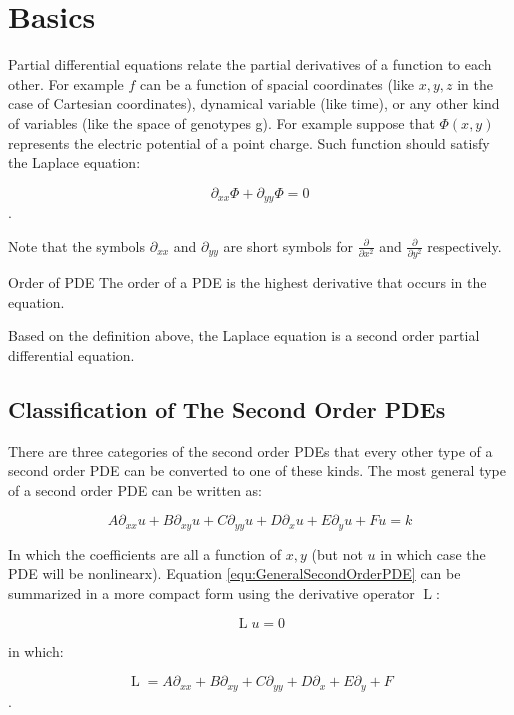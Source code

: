 \section{Basics}
Partial differential equations relate the partial derivatives of a function to each other. For example $f$ can be a function of spacial coordinates (like $x,y,z$ in the case of Cartesian coordinates), dynamical variable (like time), or any other kind of variables (like the space of genotypes g). For example suppose that $ \Phi(x,y) $ represents the electric potential of a point charge. Such function should satisfy the Laplace equation:

\[	 \partial_{xx} \Phi + \partial_{yy} \Phi = 0	\]. 

Note that the symbols $ \partial_{xx} $ and $ \partial_{yy} $ are short symbols for $ \frac{\partial}{\partial x^2} $ and $ \frac{\partial}{\partial y^2} $ respectively.

\begin{defbox}{Order of PDE}
	The order of a PDE is the highest derivative that occurs in the equation. 
\end{defbox}

Based on the definition above, the Laplace equation is a second order partial differential equation. 

\subsection{Classification of The Second Order PDEs }

There are three categories of the second order PDEs that every other type of a second order PDE can be converted to one of these kinds. The most general type of a second order PDE can be written as:

\begin{equation}
	A \partial_{xx} u + B \partial_{xy} u + C \partial_{yy} u + D \partial_{x} u + E \partial_{y} u + F u = k
	\label{equ:GeneralSecondOrderPDE}
\end{equation}

In which the coefficients are all a function of $x,y$ (but not $ u $ in which case the PDE will be nonlinearx). Equation \ref{equ:GeneralSecondOrderPDE} can be summarized in a more compact form using the derivative operator $ \operatorname{L} $: 

\[	 \operatorname{L} u = 0	\]

in which:

\[  \operatorname{L} = A \partial_{xx} + B \partial_{xy} + C \partial_{yy} + D \partial_{x} + E \partial_{y} + F \].

